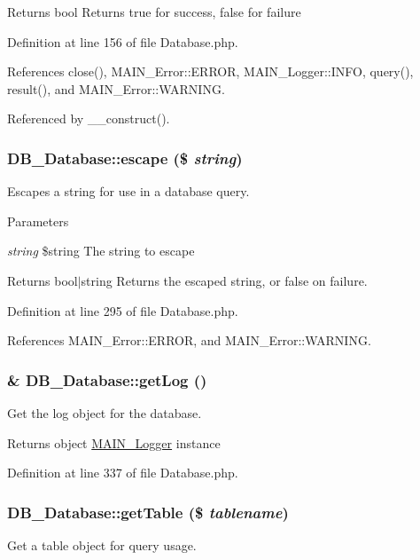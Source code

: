 \begin{DoxyReturn}{Returns}
bool Returns true for success, false for failure 
\end{DoxyReturn}


Definition at line 156 of file Database.php.

References close(), MAIN\_\-Error::ERROR, MAIN\_\-Logger::INFO, query(), result(), and MAIN\_\-Error::WARNING.

Referenced by \_\-\_\-construct().\hypertarget{classDB__Database_af8c352a06f1cff03f2c782b9aa431b44}{
\subsubsection[{escape}]{\setlength{\rightskip}{0pt plus 5cm}DB\_\-Database::escape (\$ {\em string})}}
\label{d3/d63/classDB__Database_af8c352a06f1cff03f2c782b9aa431b44}
Escapes a string for use in a database query.


\begin{DoxyParams}{Parameters}
\item[{\em string}]\$string The string to escape\end{DoxyParams}
\begin{DoxyReturn}{Returns}
bool$|$string Returns the escaped string, or false on failure. 
\end{DoxyReturn}


Definition at line 295 of file Database.php.

References MAIN\_\-Error::ERROR, and MAIN\_\-Error::WARNING.\hypertarget{classDB__Database_a98b8b2e954b888100ca2b6c00be811be}{
\subsubsection[{getLog}]{\setlength{\rightskip}{0pt plus 5cm}\& DB\_\-Database::getLog ()}}
\label{d3/d63/classDB__Database_a98b8b2e954b888100ca2b6c00be811be}
Get the log object for the database.

\begin{DoxyReturn}{Returns}
object \hyperlink{classMAIN__Logger}{MAIN\_\-Logger} instance 
\end{DoxyReturn}


Definition at line 337 of file Database.php.\hypertarget{classDB__Database_a3c1f6f79bdf1a2f2d019fd4fbf156819}{
\subsubsection[{getTable}]{\setlength{\rightskip}{0pt plus 5cm}DB\_\-Database::getTable (\$ {\em tablename})}}
\label{d3/d63/classDB__Database_a3c1f6f79bdf1a2f2d019fd4fbf156819}
Get a table object for query usage.

